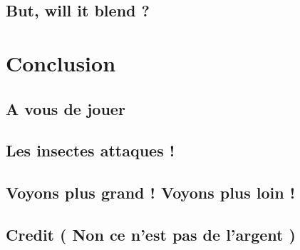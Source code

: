 \documentclass[11pt]{book}
\begin{document}
	\section{But, will it blend ?}

\chapter{Conclusion}
	\section{A vous de jouer}
	
	\section{Les insectes attaques !}
	
	\section{Voyons plus grand ! Voyons plus loin !}
	
	\section{Credit ( Non ce n'est pas de l'argent )}
\end{document}
